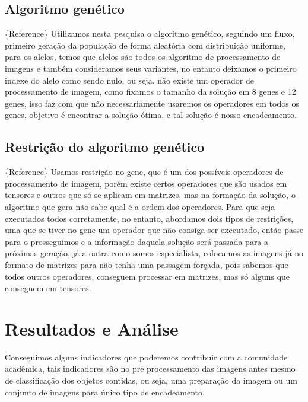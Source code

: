 \documentclass[fleqn,12pt]{SelfArx} %
\begin{document}
\subsection{Algoritmo genético}

\{Reference\} Utilizamos nesta pesquisa o algoritmo genético, seguindo um fluxo,
primeiro geração da população de forma aleatória com distribuição uniforme, para
os alelos, temos que alelos são todos os algoritmo de processamento de imagens e
também consideramos seus variantes, no entanto deixamos o primeiro indexe do
alelo como sendo nulo, ou seja, não existe um operador de processamento de
imagem, como fixamos o tamanho da solução em 8 genes e 12 genes, isso faz com
que não necessariamente usaremos os operadores em todos os genes, objetivo é
encontrar a solução ótima, e tal solução é nosso encadeamento.

\subsection{Restrição do algoritmo genético}

\{Reference\} Usamos restrição no gene, que é um dos possíveis operadores de
processamento de imagem, porém existe certos operadores que são usados em
tensores e outros que só se aplicam em matrizes, mas na formação da solução, o
algoritmo que gera não sabe qual é a ordem dos operadores. Para que seja
executados todos corretamente, no entanto, abordamos dois tipos de restrições,
uma que se tiver no gene um operador que não consiga ser executado, então passe
para o prosseguimos e a informação daquela solução será passada para a próximas
geração, já a outra como somos especialista, colocamos as imagens já no formato
de matrizes para não tenha uma passagem forçada, pois sabemos que todos outros
operadores, conseguem processar em matrizes, mas só alguns que conseguem em
tensores.



\section{Resultados e Análise}

Conseguimos alguns indicadores que poderemos contribuir com a comunidade
acadêmica, tais indicadores são no pre processamento das imagens antes mesmo de
classificação dos objetos contidas, ou seja, uma preparação da imagem ou um
conjunto de imagens para único tipo de encadeamento. 
\end{document}
